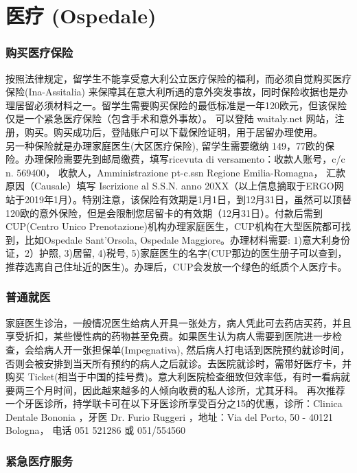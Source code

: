 \section{医疗 (Ospedale)}


\subsubsection{购买医疗保险}

按照法律规定，留学生不能享受意大利公立医疗保险的福利，而必须自觉购买医疗保险(Ina-Assitalia) 来保障其在意大利所遇的意外突发事故，同时保险收据也是办理居留必须材料之一。留学生需要购买保险的最低标准是一年120欧元，但该保险仅是一个紧急医疗保险（包含手术和意外事故）。
可以登陆 waitaly.net 网站，注册，购买。购买成功后，登陆账户可以下载保险证明，用于居留办理使用。\\
另一种保险就是办理家庭医生(大区医疗保险), 留学生需要缴纳 149，77欧的保险。办理保险需要先到邮局缴费，填写ricevuta di versamento：收款人账号，c/c n. 569400， 收款人，Amministrazione pt-c.ssn Regione Emilia-Romagna， 汇款原因（Causale）填写 Iscrizione al S.S.N. anno 20XX（以上信息摘取于ERGO网站于2019年1月）。特别注意，该保险有效期是1月1日，到12月31日，虽然可以顶替120欧的意外保险，但是会限制您居留卡的有效期（12月31日）。付款后需到CUP(Centro Unico Prenotazione)机构办理家庭医生，CUP机构在大型医院都可找到，比如Ospedale Sant'Orsola, Ospedale Maggiore。办理材料需要: 1)意大利身份证，2）护照, 3)居留, 4)税号, 5)家庭医生的名字(CUP那边的医生册子可以查到，推荐选离自己住址近的医生)。办理后，CUP会发放一个绿色的纸质个人医疗卡。

\subsubsection{普通就医}
家庭医生诊治，一般情况医生给病人开具一张处方，病人凭此可去药店买药，并且享受折扣，某些慢性病的药物甚至免费。如果医生认为病人需要到医院进一步检查，会给病人开一张担保单(Impegnativa), 然后病人打电话到医院预约就诊时间，否则会被安排到当天所有预约的病人之后就诊。去医院就诊时，需带好医疗卡，并购买 Ticket(相当于中国的挂号费)。意大利医院检查细致但效率低，有时一看病就要两三个月时间，因此越来越多的人倾向收费的私人诊所，尤其牙科。
再次推荐一个牙医诊所，持学联卡可在以下牙医诊所享受百分之15的优惠，诊所：Clinica Dentale Bononia ，牙医 Dr. Furio Ruggeri ，地址：Via del Porto, 50 - 40121 Bologna， 电话 051 521286 或 051/554560 

\subsubsection{紧急医疗服务}

